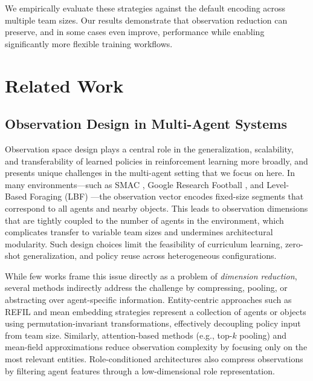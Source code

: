 \documentclass{article}
\begin{document}
We empirically evaluate these strategies against the default encoding across multiple team sizes.
Our results demonstrate that observation reduction can preserve, and in some cases even improve,
performance while enabling significantly more flexible training workflows.



\section{Related Work}
\subsection{Observation Design in Multi-Agent Systems}

Observation space design plays a central role in the generalization, scalability, 
and transferability of learned policies in reinforcement learning more broadly, 
and presents unique challenges in the multi-agent setting that we focus on here. 
In many environments—such as SMAC \cite{samvelyan2019}, Google Research Football \cite{kurach2020},
and Level-Based Foraging (LBF) \cite{papoudakis2021}—the observation vector encodes fixed-size 
segments that correspond to all agents and nearby objects. 
This leads to observation dimensions that are tightly coupled to the number of agents
in the environment, which complicates transfer to variable team sizes and undermines architectural
modularity. 
Such design choices limit the feasibility of curriculum learning, zero-shot generalization,
and policy reuse across heterogeneous configurations.

While few works frame this issue directly as a problem of \textit{dimension reduction}, 
several methods indirectly address the challenge by compressing, pooling, 
or abstracting over agent-specific information.
Entity-centric approaches such as REFIL \cite{iqbal2021} and mean embedding strategies
\cite{huttenrauch2019} represent a collection of agents or objects using permutation-invariant
transformations, effectively decoupling policy input from team size. Similarly, attention-based methods
(e.g., top-$k$ pooling) and mean-field approximations \cite{yang2021a} reduce observation complexity
by focusing only on the most relevant entities. Role-conditioned architectures
\cite{gupta2017, kouzeghar2023} also compress observations by filtering agent features through
a low-dimensional role representation.
\end{document}
